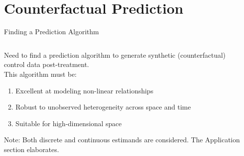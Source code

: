 \section{Counterfactual Prediction}

\begin{frame}{Finding a Prediction Algorithm}
    \begin{columns}
    \begin{column}{0.6\linewidth}
    Need to find a prediction algorithm to generate synthetic (counterfactual) control data post-treatment. \\
    This algorithm must be:
      \begin{enumerate}
         \item {Excellent at modeling non-linear relationships}
         \item {Robust to unobserved heterogeneity across space and time}
         \item {Suitable for high-dimensional space}
      \end{enumerate}
      \vspace{5pt}
    \footnotesize{Note: Both discrete and continuous estimands are considered. The Application section elaborates.}
    \end{column}
    \begin{column}{0.4\linewidth}
    \end{column}
  \end{columns}
\end{frame}

